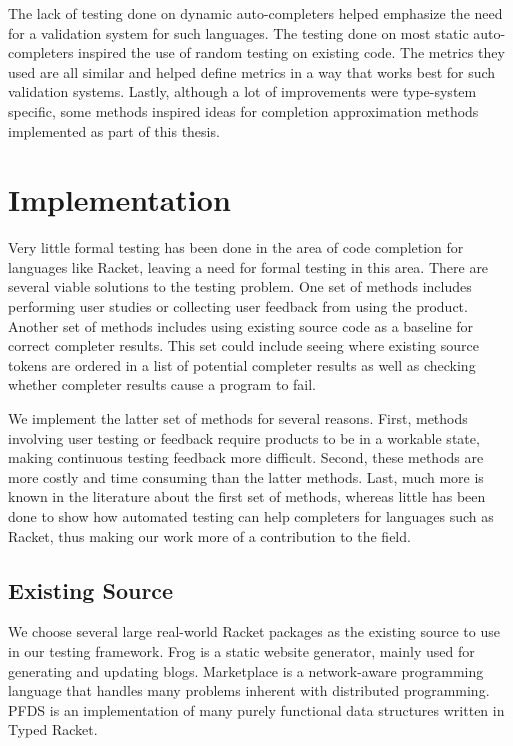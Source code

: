 \documentclass[ms,electronic,twosidetoc,letterpaper,chaptercenter,parttop,lol,lof,lot]{byumsphd}
\begin{document}
The lack of testing done on dynamic auto-completers helped emphasize the need for a validation system for such languages.
The testing done on most static auto-completers inspired the use of random testing on existing code.
The metrics they used are all similar and helped define metrics in a way that works best for such validation systems.
Lastly, although a lot of improvements were type-system specific, some methods inspired ideas for completion approximation methods implemented as part of this thesis.

\chapter{Implementation}

Very little formal testing has been done in the area of code completion for languages like Racket, leaving a need for formal testing in this area.
There are several viable solutions to the testing problem.
One set of methods includes performing user studies or collecting user feedback from using the product.
Another set of methods includes using existing source code as a baseline for correct completer results.
This set could include seeing where existing source tokens are ordered in a list of potential completer results as well as checking whether completer results cause a program to fail.

We implement the latter set of methods for several reasons.
First, methods involving user testing or feedback require products to be in a workable state, making continuous testing feedback more difficult.
Second, these methods are more costly and time consuming than the latter methods.
Last, much more is known in the literature about the first set of methods, whereas little has been done to show how automated testing can help completers for languages such as Racket, thus making our work more of a contribution to the field.

\section{Existing Source}

We choose several large real-world Racket packages as the existing source to use in our testing framework.
Frog is a static website generator, mainly used for generating and updating blogs.
Marketplace is a network-aware programming language that handles many problems inherent with distributed programming.
PFDS is an implementation of many purely functional data structures written in Typed Racket.
\end{document}
